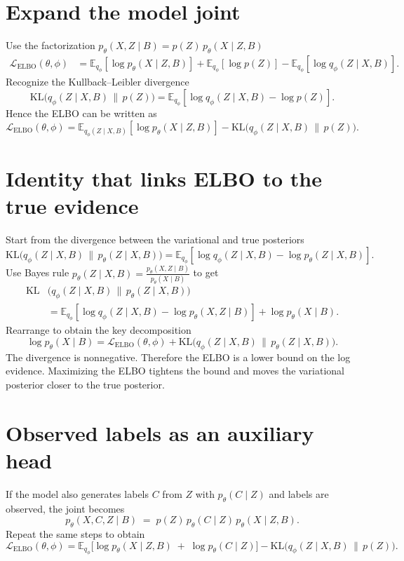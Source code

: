 \documentclass[11pt,a4paper]{article}
\begin{document}
\section{Expand the model joint}
Use the factorization \(p_\theta(X,Z \mid B)=p(Z)\,p_\theta(X \mid Z,B)\)
\begin{align*}
\mathcal{L}_{\text{ELBO}}(\theta,\phi)
&= \mathbb{E}_{q_\phi}\!\left[ \log p_\theta(X \mid Z,B) \right]
+ \mathbb{E}_{q_\phi}\!\left[ \log p(Z) \right]
- \mathbb{E}_{q_\phi}\!\left[ \log q_\phi(Z \mid X,B) \right].
\end{align*}
Recognize the Kullback–Leibler divergence
\[
\mathrm{KL}\!\big(q_\phi(Z \mid X,B)\,\|\,p(Z)\big)
= \mathbb{E}_{q_\phi}\!\left[ \log q_\phi(Z \mid X,B) - \log p(Z) \right].
\]
Hence the ELBO can be written as
\[
\boxed{
\mathcal{L}_{\text{ELBO}}(\theta,\phi)
= \mathbb{E}_{q_\phi(Z \mid X,B)}\!\left[ \log p_\theta(X \mid Z,B) \right]
- \mathrm{KL}\!\big(q_\phi(Z \mid X,B)\,\|\,p(Z)\big).
}
\]

\section{Identity that links ELBO to the true evidence}
Start from the divergence between the variational and true posteriors
\[
\mathrm{KL}\!\big(q_\phi(Z \mid X,B)\,\|\,p_\theta(Z \mid X,B)\big)
= \mathbb{E}_{q_\phi}\!\left[\log q_\phi(Z \mid X,B) - \log p_\theta(Z \mid X,B)\right].
\]
Use Bayes rule \(p_\theta(Z \mid X,B)=\tfrac{p_\theta(X,Z \mid B)}{p_\theta(X \mid B)}\) to get
\begin{align*}
\mathrm{KL}&\!\big(q_\phi(Z \mid X,B)\,\|\,p_\theta(Z \mid X,B)\big) \\
&= \mathbb{E}_{q_\phi}\!\left[\log q_\phi(Z \mid X,B) - \log p_\theta(X,Z \mid B)\right] + \log p_\theta(X \mid B).
\end{align*}
Rearrange to obtain the key decomposition
\[
\boxed{
\log p_\theta(X \mid B)
= \mathcal{L}_{\text{ELBO}}(\theta,\phi)
+ \mathrm{KL}\!\big(q_\phi(Z \mid X,B)\,\|\,p_\theta(Z \mid X,B)\big).
}
\]
The divergence is nonnegative. Therefore the ELBO is a lower bound on the log evidence. Maximizing the ELBO tightens the bound and moves the variational posterior closer to the true posterior.

\section{Observed labels as an auxiliary head}
If the model also generates labels \(C\) from \(Z\) with \(p_\theta(C \mid Z)\) and labels are observed, the joint becomes
\[
p_\theta(X,C,Z \mid B) \;=\; p(Z)\, p_\theta(C \mid Z)\, p_\theta(X \mid Z,B).
\]
Repeat the same steps to obtain
\[
\boxed{
\mathcal{L}_{\text{ELBO}}(\theta,\phi)
= \mathbb{E}_{q_\phi}\!\Big[ \log p_\theta(X \mid Z,B) \;+\; \log p_\theta(C \mid Z) \Big]
- \mathrm{KL}\!\big(q_\phi(Z \mid X,B)\,\|\,p(Z)\big).
}
\]
\end{document}
